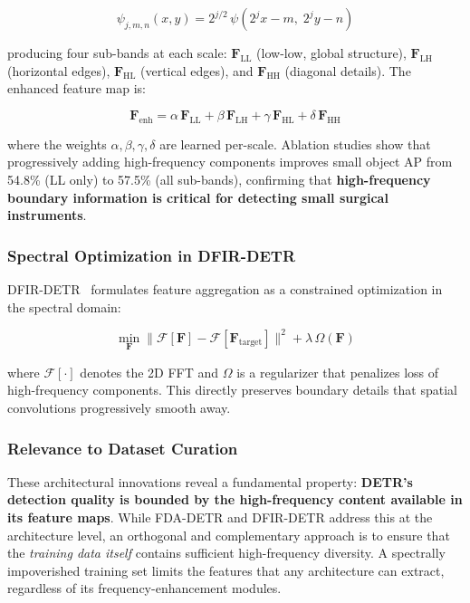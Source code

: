 \begin{equation}
    \psi_{j,m,n}(x,y) = 2^{j/2}\,\psi(2^j x - m,\; 2^j y - n)
\end{equation}

producing four sub-bands at each scale: $\mathbf{F}_{\text{LL}}$ (low-low,
global structure), $\mathbf{F}_{\text{LH}}$ (horizontal edges),
$\mathbf{F}_{\text{HL}}$ (vertical edges), and $\mathbf{F}_{\text{HH}}$
(diagonal details).  The enhanced feature map is:

\begin{equation}
    \mathbf{F}_{\text{enh}} = \alpha\,\mathbf{F}_{\text{LL}}
                            + \beta\,\mathbf{F}_{\text{LH}}
                            + \gamma\,\mathbf{F}_{\text{HL}}
                            + \delta\,\mathbf{F}_{\text{HH}}
\end{equation}

where the weights $\alpha, \beta, \gamma, \delta$ are learned per-scale.
Ablation studies show that progressively adding high-frequency components
improves small object AP from 54.8\% (LL only) to 57.5\% (all sub-bands),
confirming that \textbf{high-frequency boundary information is critical for
detecting small surgical instruments}.

\subsubsection{Spectral Optimization in DFIR-DETR}

DFIR-DETR~\cite{dfir_detr2025} formulates feature aggregation as a
constrained optimization in the spectral domain:

\begin{equation}
    \min_{\mathbf{F}}
    \|\mathcal{F}[\mathbf{F}] - \mathcal{F}[\mathbf{F}_{\text{target}}]\|^2
    + \lambda\,\Omega(\mathbf{F})
\end{equation}

where $\mathcal{F}[\cdot]$ denotes the 2D FFT and $\Omega$ is a regularizer
that penalizes loss of high-frequency components.  This directly preserves
boundary details that spatial convolutions progressively smooth away.

\subsubsection{Relevance to Dataset Curation}

These architectural innovations reveal a fundamental property: \textbf{DETR's
detection quality is bounded by the high-frequency content available in its
feature maps}.  While FDA-DETR and DFIR-DETR address this at the architecture
level, an orthogonal and complementary approach is to ensure that the
\emph{training data itself} contains sufficient high-frequency diversity.
A spectrally impoverished training set limits the features that any
architecture can extract, regardless of its frequency-enhancement modules.


